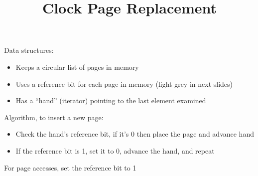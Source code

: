 

\title{Clock Page Replacement}




  \begin{frame}
    \titlepage
  \end{frame}

  \begin{slide}


    Data structures:
    \begin{itemize}
      \item Keeps a circular list of pages in memory
      \item Uses a reference bit for each page in memory (light grey in next slides)
      \item Has a ``hand'' (iterator) pointing to the last element examined
    \end{itemize}
    \medskip

    Algorithm, to insert a new page:
    \begin{itemize}
      \item Check the hand's reference bit, if it's 0 then place the page and advance hand
      \item If the reference bit is 1, set it to 0, advance the hand, and repeat
    \end{itemize}
    \medskip

    For page accesses, set the reference bit to 1

  \end{slide}

